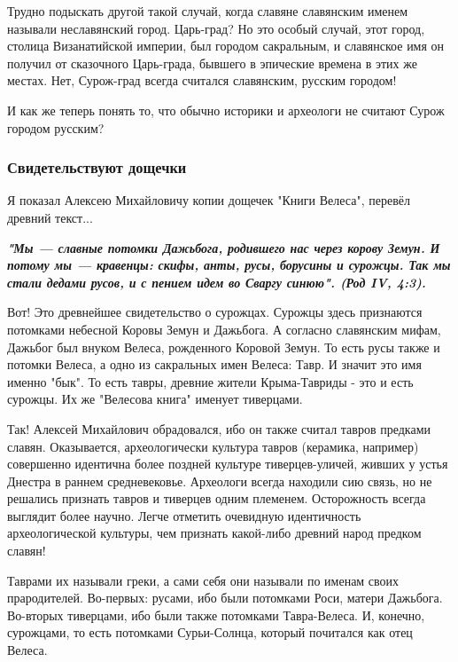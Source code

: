 Трудно подыскать другой такой случай, когда славяне славянским име­нем называли
неславянский город. Царь-град? Но это особый случай, этот город, столица
Визанатийской империи, был городом сакральным, и сла­вянское имя он получил от
сказочного Царь-града, бывшего в эпические времена в этих же местах. Нет,
Сурож-град всегда считался славянским, русским городом!

И как же теперь понять то, что обычно историки и археологи не считают Сурож
городом русским? 

\subsubsection{Свидетельствуют дощечки}

Я показал Алексею Михайловичу копии дощечек "Книги Велеса", перевёл древний
текст...

\begin{leftbar}
  \begingroup
    \em\Large\bfseries\color{blue}
"Мы — славные потомки Дажьбога, родившего нас через корову Земун. И потому мы —
кравенцы: скифы, анты, русы, борусины и су­рожцы. Так мы стали дедами русов, и
с пением идем во Сваргу синюю". (Род IV, 4:3).
  \endgroup
\end{leftbar}

Вот! Это древнейшее свидетельство о сурожцах. Сурожцы здесь при­знаются
потомками небесной Коровы Земун и Дажьбога. А согласно славянским мифам,
Дажьбог был внуком Велеса, рожденного Коровой Земун. То есть русы также и
потомки Велеса, а одно из са­кральных имен Велеса: Тавр. И значит это имя
именно "бык". То есть тавры, древние жители Крыма-Тавриды - это и есть сурожцы.
Их же "Велесова книга" именует тиверцами.

Так! Алексей Михайлович обрадовался, ибо он также считал тавров предками
славян. Оказывается, археологически культура тавров (керамика, например)
совершенно идентична более поздней культуре тиверцев-уличей, живших у устья
Днестра в раннем средневековье. Археологи всегда на­ходили сию связь, но не
решались признать тавров и тиверцев одним пле­менем. Осторожность всегда
выглядит более научно. Легче отметить оче­видную идентичность археологической
культуры, чем признать какой-либо древний народ предком славян!

Таврами их называли греки, а сами себя они называли по именам своих
прародителей. Во-первых: русами, ибо были потомками Роси, матери Дажьбога.
Во-вторых тиверцами, ибо были также потомками Тавра-Велеса. И, ко­нечно,
сурожцами, то есть потомками Сурьи-Солнца, который по­читался как отец Велеса.

